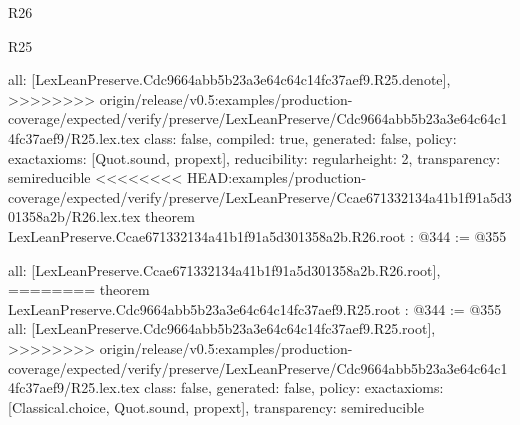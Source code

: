 \begin{lexlean}{R26}
\begin{lexlean}{R25}
\begin{coremodule}
{{{{{  all: [LexLeanPreserve.Cdc9664abb5b23a3e64c64c14fc37aef9.R25.denote],
>>>>>>>> origin/release/v0.5:examples/production-coverage/expected/verify/preserve/LexLeanPreserve/Cdc9664abb5b23a3e64c64c14fc37aef9/R25.lex.tex
  class: false,
  compiled: true,
  generated: false,
  policy: exact{axioms: [Quot.sound, propext]},
  reducibility: regular{height: 2},
  transparency: semireducible
}
<<<<<<<< HEAD:examples/production-coverage/expected/verify/preserve/LexLeanPreserve/Ccae671332134a41b1f91a5d301358a2b/R26.lex.tex
theorem LexLeanPreserve.Ccae671332134a41b1f91a5d301358a2b.R26.root : @344 := @355 {
  all: [LexLeanPreserve.Ccae671332134a41b1f91a5d301358a2b.R26.root],
========
theorem LexLeanPreserve.Cdc9664abb5b23a3e64c64c14fc37aef9.R25.root : @344 := @355 {
  all: [LexLeanPreserve.Cdc9664abb5b23a3e64c64c14fc37aef9.R25.root],
>>>>>>>> origin/release/v0.5:examples/production-coverage/expected/verify/preserve/LexLeanPreserve/Cdc9664abb5b23a3e64c64c14fc37aef9/R25.lex.tex
  class: false,
  generated: false,
  policy: exact{axioms: [Classical.choice, Quot.sound, propext]},
  transparency: semireducible
}

}}}}}
\end{coremodule}
\end{lexlean}
\end{lexlean}
